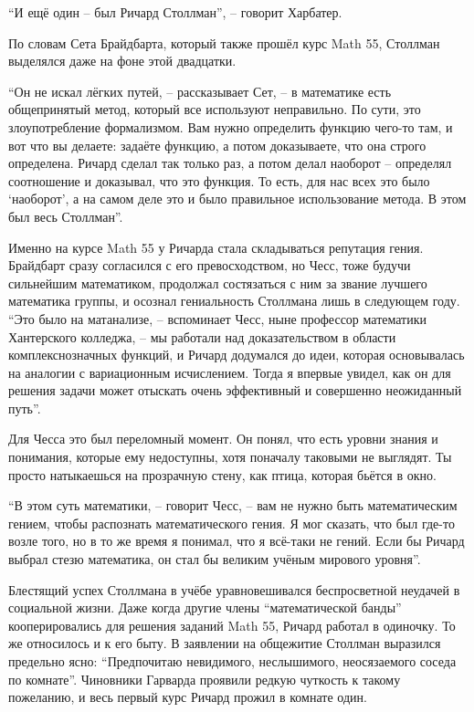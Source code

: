 \enquote{И ещё один -- был Ричард Столлман}, -- говорит Харбатер.

По словам Сета Брайдбарта, который также прошёл курс Math 55, Столлман выделялся даже на фоне этой двадцатки.

\enquote{Он не искал лёгких путей, -- рассказывает Сет, -- в математике есть общепринятый метод, который все используют неправильно. По сути, это злоупотребление формализмом. Вам нужно определить функцию чего-то там, и вот что вы делаете: задаёте функцию, а потом доказываете, что она строго определена. Ричард сделал так только раз, а потом делал наоборот -- определял соотношение и доказывал, что это функция. То есть, для нас всех это было \enquote{наоборот}, а на самом деле это и было правильное использование метода. В этом был весь Столлман}.

Именно на курсе Math 55 у Ричарда стала складываться репутация гения. Брайдбарт сразу согласился с его превосходством, но Чесс, тоже будучи сильнейшим математиком, продолжал состязаться с ним за звание лучшего математика группы, и осознал гениальность Столлмана лишь в следующем году. \enquote{Это было на матанализе, -- вспоминает Чесс, ныне профессор математики Хантерского колледжа, -- мы работали над доказательством в области комплекснозначных функций, и Ричард додумался до идеи, которая основывалась на аналогии с вариационным исчислением. Тогда я впервые увидел, как он для решения задачи может отыскать очень эффективный и совершенно неожиданный путь}.

Для Чесса это был переломный момент. Он понял, что есть уровни знания и понимания, которые ему недоступны, хотя поначалу таковыми не выглядят. Ты просто натыкаешься на прозрачную стену, как птица, которая бьётся в окно.

\enquote{В этом суть математики, -- говорит Чесс, -- вам не нужно быть математическим гением, чтобы распознать математического гения. Я мог сказать, что был где-то возле того, но в то же время я понимал, что я всё-таки не гений. Если бы Ричард выбрал стезю математика, он стал бы великим учёным мирового уровня}.

Блестящий успех Столлмана в учёбе уравновешивался беспросветной неудачей в социальной жизни. Даже когда другие члены \enquote{математической банды} кооперировались для решения заданий Math 55, Ричард работал в одиночку. То же относилось и к его быту. В заявлении на общежитие Столлман выразился предельно ясно: \enquote{Предпочитаю невидимого, неслышимого, неосязаемого соседа по комнате}. Чиновники Гарварда проявили редкую чуткость к такому пожеланию, и весь первый курс Ричард прожил в комнате один.

